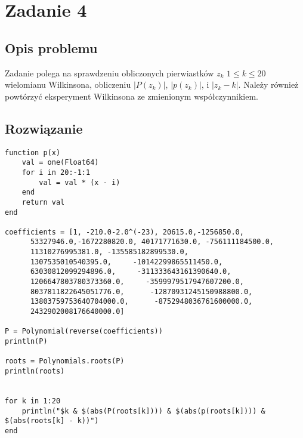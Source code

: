 \documentclass{article}
\begin{document}
\section{Zadanie 4}
\subsection{Opis problemu}
Zadanie polega na sprawdzeniu obliczonych pierwiastków $z_k$  $1 \leq k \leq 20$ wielomianu Wilkinsona, obliczeniu $\left|P(z_k)\right|$, $\left|p(z_k)\right|$, i $\left|z_k - k\right|$. Należy również powtórzyć eksperyment Wilkinsona ze zmienionym współczynnikiem.
\subsection{Rozwiązanie}
\begin{verbatim}
function p(x) 
    val = one(Float64)
    for i in 20:-1:1
        val = val * (x - i)
    end
    return val
end

coefficients = [1, -210.0-2.0^(-23), 20615.0,-1256850.0,
      53327946.0,-1672280820.0, 40171771630.0, -756111184500.0,          
      11310276995381.0, -135585182899530.0,
      1307535010540395.0,     -10142299865511450.0,
      63030812099294896.0,     -311333643161390640.0,
      1206647803780373360.0,     -3599979517947607200.0,
      8037811822645051776.0,      -12870931245150988800.0,
      13803759753640704000.0,      -8752948036761600000.0,
      2432902008176640000.0]

P = Polynomial(reverse(coefficients))
println(P)

roots = Polynomials.roots(P)
println(roots)


for k in 1:20
    println("$k & $(abs(P(roots[k]))) & $(abs(p(roots[k]))) & $(abs(roots[k] - k))")
end
\end{verbatim}
\end{document}
